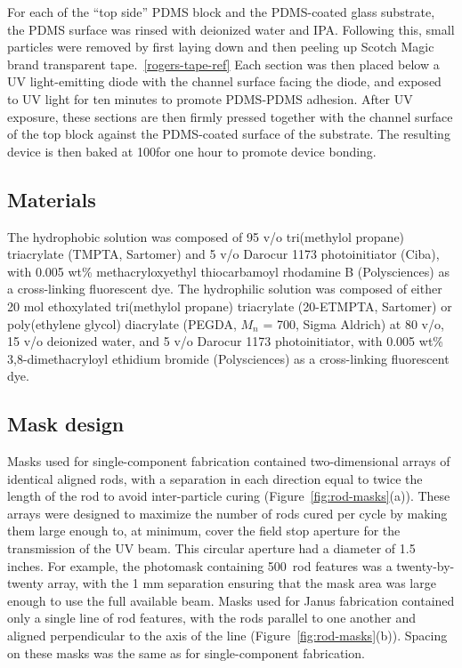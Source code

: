 For each of the ``top side'' PDMS block and the PDMS-coated glass substrate, the PDMS surface was rinsed with 
deionized water and IPA.  Following this, small particles were removed by first laying down and then peeling up
Scotch Magic brand transparent tape.~\ref{rogers-tape-ref}  Each section was then placed below a UV light-emitting
diode with the channel surface facing the diode, and exposed to UV light for ten minutes to promote PDMS-PDMS
adhesion.  After UV exposure, these sections are then firmly pressed together with the channel surface of the top
block against the PDMS-coated surface of the substrate.  The resulting device is then baked at 100\degC for one hour
to promote device bonding.

\subsection{Materials}
The hydrophobic solution was composed of 95 v/o 
tri(methylol propane) triacrylate (TMPTA, Sartomer) and 5 v/o Darocur 1173 photoinitiator (Ciba), 
with 0.005 wt\% methacryloxyethyl thiocarbamoyl rhodamine B (Polysciences) as a cross-linking 
fluorescent dye.
The hydrophilic solution was composed of either 20 mol ethoxylated tri(methylol propane) triacrylate (20-ETMPTA,
Sartomer) or poly(ethylene glycol) diacrylate (PEGDA, $M_n$ = 700, Sigma Aldrich) at 80 v/o, 
15 v/o deionized water, and 5 v/o Darocur 1173 photoinitiator, with 0.005 wt\% 
3,8-dimethacryloyl ethidium bromide (Polysciences) as a cross-linking fluorescent dye.


\subsection{Mask design}

Masks used for single-component fabrication contained two-dimensional arrays of identical aligned 
rods, with a separation in each direction equal to twice the length of the rod to avoid inter-particle
curing (Figure~\ref{fig:rod-masks}(a)). These arrays were designed to maximize the number of 
rods cured per cycle by making them large enough to, at minimum,
cover the field stop aperture for the transmission of the UV beam. This circular aperture 
had a diameter of 1.5 inches.  For example, the photomask containing 500~\microns rod features
was a twenty-by-twenty array, with the 1 mm separation ensuring that the mask area was large enough to
use the full available beam.  
Masks used for Janus fabrication contained only a single line of rod features, with the rods parallel to one 
another and aligned perpendicular to the axis of the line (Figure~\ref{fig:rod-masks}(b)).  Spacing on these 
masks was the same as for single-component fabrication.


